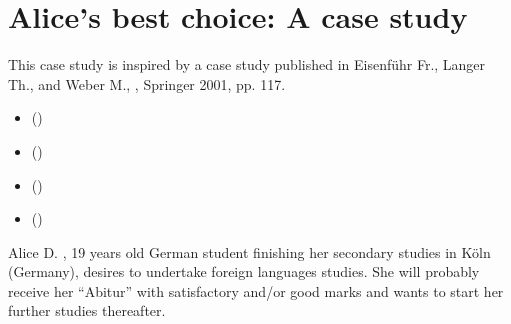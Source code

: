 \documentclass[a4paper,12pt,english]{sphinxhowto}
\let\sphinxpxdimen\pdfpxdimen\else\newdimen\sphinxpxdimen
\begin{document}
\section{Alice’s best choice: A  case study \sphinxfootnotemark[19]}
\label{\detokenize{tutorial:alice-s-best-choice-a-selection-case-study-19}}\label{\detokenize{tutorial:alice-tutorial-label}}%
\begin{footnotetext}[19]\sphinxAtStartFootnote
This case study is inspired by a  case study published in Eisenführ Fr., Langer Th., and Weber M., , Springer 2001, pp. 1\sphinxhyphen{}17.
%
\end{footnotetext}\ignorespaces 
\begin{sphinxShadowBox}
\begin{itemize}
\item {} 
\label{\detokenize{tutorial:id279}}{\hyperref[\detokenize{tutorial:the-decision-problem}]{}} ()

\item {} 
\label{\detokenize{tutorial:id280}}{\hyperref[\detokenize{tutorial:the-performance-tableau}]{}} ()

\item {} 
\label{\detokenize{tutorial:id281}}{\hyperref[\detokenize{tutorial:building-a-best-choice-recommendation}]{}} ()

\item {} 
\label{\detokenize{tutorial:id282}}{\hyperref[\detokenize{tutorial:robustness-analysis}]{}} ()

\end{itemize}
\end{sphinxShadowBox}

\sphinxincludegraphics[width=100\sphinxpxdimen]{{AliceFo}.png} Alice D. , 19 years old German student finishing her secondary studies in Köln (Germany), desires to undertake foreign languages studies. She will probably receive her “Abitur” with satisfactory and/or good marks and  wants to start her further studies thereafter.
\end{document}
